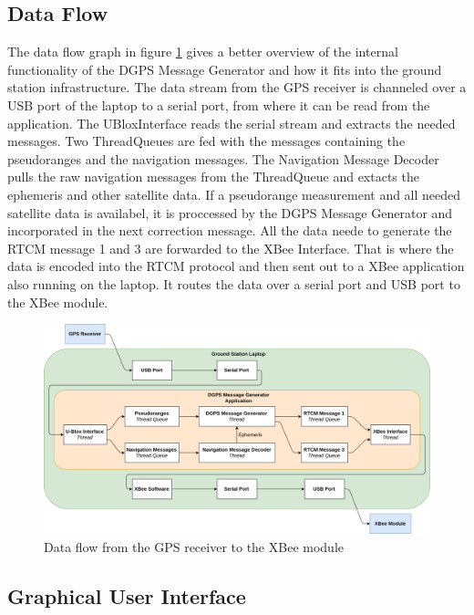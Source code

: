 \subsection{Data Flow}

The data flow graph in figure \ref{fig:data_flow} gives a better overview of the internal functionality of the DGPS Message Generator and how it fits into the ground station infrastructure.
The data stream from the GPS receiver is channeled over a USB port of the laptop to a serial port, from where it can be read from the application.
The UBloxInterface reads the serial stream and extracts the needed messages.
Two ThreadQueues are fed with the messages containing the pseudoranges and the navigation messages.
The Navigation Message Decoder pulls the raw navigation messages from the ThreadQueue and extacts the ephemeris and other satellite data.
If a pseudorange measurement and all needed satellite data is availabel, it is proccessed by the DGPS Message Generator and incorporated in the next correction message.
All the data neede to generate the RTCM message 1 and 3 are forwarded to the XBee Interface.
That is where the data is encoded into the RTCM protocol and then sent out to a XBee application also running on the laptop.
It routes the data over a serial port and USB port to the XBee module.

\begin{figure}[ht]
 \centering
 \includegraphics[width=\textwidth]{images/Data_Flow.png}
 \caption{Data flow from the GPS receiver to the XBee module}
 \label{fig:data_flow}
\end{figure}

\subsection{Graphical User Interface}

